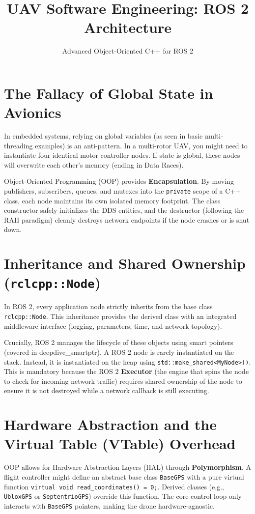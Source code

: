 \documentclass{article}
\title{UAV Software Engineering: ROS 2 Architecture}
\author{Advanced Object-Oriented C++ for ROS 2}
\date{}
\begin{document}
\maketitle

\section{The Fallacy of Global State in Avionics}
In embedded systems, relying on global variables (as seen in basic multi-threading examples) is an anti-pattern. 
In a multi-rotor UAV, you might need to instantiate four identical motor controller nodes. 
If state is global, these nodes will overwrite each other's memory (ending in Data Races). 

Object-Oriented Programming (OOP) provides \textbf{Encapsulation}. By moving publishers, subscribers, queues, 
and mutexes into the \texttt{private} scope of a C++ class, each node maintains its own isolated memory footprint. 
The class constructor safely initializes the DDS entities, and the destructor (following the RAII paradigm) cleanly destroys network endpoints 
if the node crashes or is shut down.

\section{Inheritance and Shared Ownership (\texttt{rclcpp::Node})}
In ROS 2, every application node strictly inherits from the base class \texttt{rclcpp::Node}. 
This inheritance provides the derived class with an integrated middleware interface (logging, parameters, time, and network topology).

Crucially, ROS 2 manages the lifecycle of these objects using smart pointers (covered in deepdive\_smartptr). 
A ROS 2 node is rarely instantiated on the stack. Instead, it is instantiated on the heap using \texttt{std::make\_shared<MyNode>()}. 
This is mandatory because the ROS 2 \textbf{Executor} (the engine that spins the node to check for incoming network traffic) requires shared ownership 
of the node to ensure it is not destroyed while a network callback is still executing.

\section{Hardware Abstraction and the Virtual Table (VTable) Overhead}
OOP allows for Hardware Abstraction Layers (HAL) through \textbf{Polymorphism}. 
A flight controller might define an abstract base class \texttt{BaseGPS} with a pure virtual function \texttt{virtual void read\_coordinates() = 0;}. 
Derived classes (e.g., \texttt{UbloxGPS} or \texttt{SeptentrioGPS}) override this function. The core control loop only interacts with \texttt{BaseGPS} 
pointers, making the drone hardware-agnostic.
\end{document}
